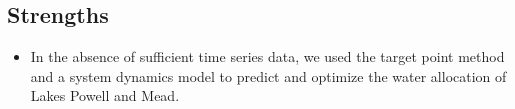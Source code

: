 \subsection{Strengths}
\begin{itemize}
    \item In the absence of sufficient time series data, we used the target point method and a system dynamics model to predict and optimize the water allocation of Lakes Powell and Mead.
\end{itemize}